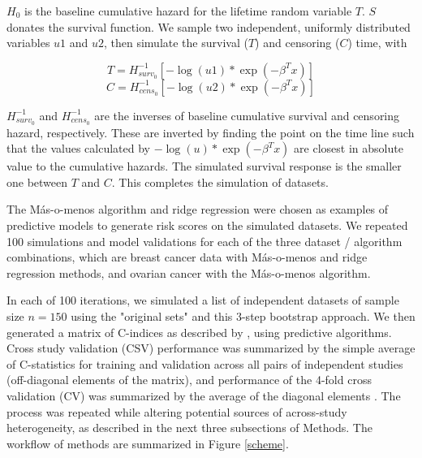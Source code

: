 \documentclass{bioinfo}
\begin{document}
    $H_{0}$ is the baseline cumulative hazard for the lifetime random variable $T$. $S$ donates the survival function. We sample two independent, uniformly distributed
    variables $u1$ and $u2$, then simulate the survival ($T$) and censoring ($C$)
    time, with

    \begin{equation}\label{survivaltime}
      T = H_{surv_{0}}^{-1} [ - \log(u1) * \exp(-\beta^{T}x)]
    \end{equation}
    \begin{equation}\label{censoringtime}
      C = H_{cens_{0}}^{-1} [ - \log(u2) * \exp(-\beta^{T}x)]
    \end{equation}

    $H_{surv_{0}}^{-1}$ and $H_{cens_{0}}^{-1}$ are the inverses
    of baseline cumulative survival and censoring hazard, respectively.  These
    are inverted by finding
    the point on the time line such that the values calculated by
    $- \log(u) * \exp(- \beta^{T}x)$ are closest in absolute value to the
    cumulative hazards. The simulated survival response is the smaller one between
    $T$ and $C$. This completes the simulation of datasets.

	The M\'{a}s-o-menos algorithm \citep{Zhao2014} and ridge 
	regression \citep{hoerl1970ridge} were chosen as
    examples of predictive models to generate risk scores on the simulated datasets. 
    We repeated 100 simulations and model validations 
    for each of the three dataset / algorithm combinations, 
    which are breast cancer data with M\'{a}s-o-menos and ridge regression methods, 
    and ovarian cancer with the M\'{a}s-o-menos algorithm.
    
    In each of 100 iterations, we simulated a list of independent datasets of
    sample size $n=150$ using the "original sets" and this 3-step bootstrap approach.  We
    then generated a matrix of C-indices as described by
    \citet{Bernau2014}, using predictive algorithms. %
    Cross study validation (CSV) performance was summarized by the
    simple average of C-statistics for training and validation across
    all pairs of independent studies (off-diagonal elements of the
    matrix), and performance of the 4-fold cross validation (CV) was summarized by the average
    of the diagonal elements \citep{Bernau2014}. The process was
    repeated while altering potential sources of across-study
    heterogeneity, as described in the next three subsections of
    Methods. The workflow of methods are summarized in Figure \ref{scheme}.
\end{document}
